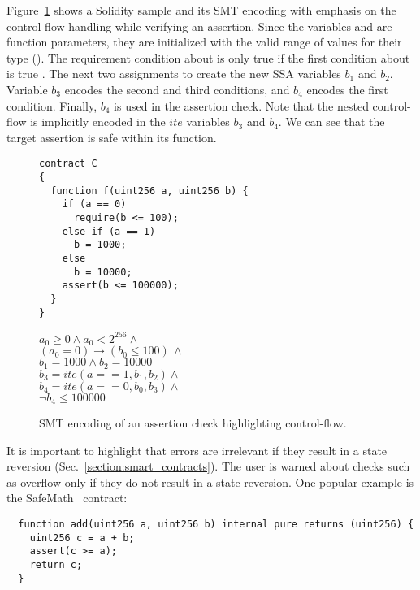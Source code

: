 Figure~\ref{figure:solidity_encoding_1} shows a Solidity sample and its SMT
encoding with emphasis on the control flow handling while verifying an assertion.
%
Since the variables  and  are function parameters, they
are initialized with the valid range of values for their type ().
%
The requirement condition about  is only true if the first condition
about  is true .
%
The next two assignments to  create the new SSA variables
$b_1$ and $b_2$.
%
Variable $b_3$ encodes the second and third conditions, and $b_4$
encodes the first condition.
%
Finally, $b_4$ is used in the assertion check.
%
Note that the nested control-flow is implicitly encoded in the $ite$
variables $b_3$ and $b_4$.
%
We can see that the target assertion is safe within its function.

\begin{figure}
\label{figure:solidity_encoding_1}
\noindent\begin{minipage}{.48\textwidth}
\begin{verbatim}
contract C
{
  function f(uint256 a, uint256 b) {
    if (a == 0)
      require(b <= 100);
    else if (a == 1)
      b = 1000;
    else
      b = 10000;
    assert(b <= 100000);
  }
}
\end{verbatim}
\end{minipage}\hfill
\begin{minipage}{.48\textwidth}
$a_0 \ge 0 \land a_0 < 2^{256}  \land \phantom{x}$\\
$(a_0 = 0) \rightarrow (b_0 \le 100) \, \land$\\
$b_1 = 1000 \land b_2 = 10000$\\
$b_3 = ite(a == 1, b_1, b_2) \land \phantom{x}$\\
$b_4 = ite(a == 0, b_0, b_3) \land \phantom{x}$\\
$\neg b_4 \le 100000$
\end{minipage}
\caption{SMT encoding of an assertion check highlighting control-flow.}
\end{figure}

It is important to highlight that errors are irrelevant if they result in a
state reversion (Sec.~\ref{section:smart_contracts}). The user is warned
about checks such as overflow only if they do not result in a state reversion.
%
One popular example is the SafeMath~\cite{SafeMath} contract:

\begin{verbatim}
  function add(uint256 a, uint256 b) internal pure returns (uint256) {
    uint256 c = a + b;
    assert(c >= a);
    return c;
  }
\end{verbatim}

